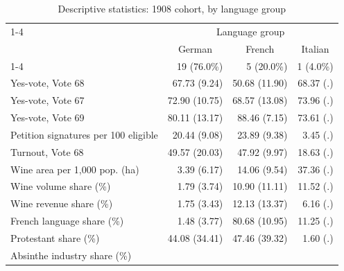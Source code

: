 \begin{table}[!h]
\caption{Descriptive statistics: 1908 cohort, by language group}
\centering
\begin{tabular}{llll}
\cline{1-4}
\multicolumn{1}{r}{} &
  \multicolumn{3}{c}{Language group} \\
\multicolumn{1}{r}{} &
  \multicolumn{1}{c}{German} &
  \multicolumn{1}{c}{French} &
  \multicolumn{1}{c}{Italian} \\
\cline{1-4}
\multicolumn{1}{l}{N} &
  \multicolumn{1}{r}{19 (76.0\%)} &
  \multicolumn{1}{r}{5 (20.0\%)} &
  \multicolumn{1}{r}{1 (4.0\%)} \\
\multicolumn{1}{l}{Yes-vote, Vote 68} &
  \multicolumn{1}{r}{67.73 (9.24)} &
  \multicolumn{1}{r}{50.68 (11.90)} &
  \multicolumn{1}{r}{68.37 (.)} \\
\multicolumn{1}{l}{Yes-vote, Vote 67} &
  \multicolumn{1}{r}{72.90 (10.75)} &
  \multicolumn{1}{r}{68.57 (13.08)} &
  \multicolumn{1}{r}{73.96 (.)} \\
\multicolumn{1}{l}{Yes-vote, Vote 69} &
  \multicolumn{1}{r}{80.11 (13.17)} &
  \multicolumn{1}{r}{88.46 (7.15)} &
  \multicolumn{1}{r}{73.61 (.)} \\
\multicolumn{1}{l}{Petition signatures per 100 eligible} &
  \multicolumn{1}{r}{20.44 (9.08)} &
  \multicolumn{1}{r}{23.89 (9.38)} &
  \multicolumn{1}{r}{3.45 (.)} \\
\multicolumn{1}{l}{Turnout, Vote 68} &
  \multicolumn{1}{r}{49.57 (20.03)} &
  \multicolumn{1}{r}{47.92 (9.97)} &
  \multicolumn{1}{r}{18.63 (.)} \\
\multicolumn{1}{l}{Wine area per 1,000 pop. (ha)} &
  \multicolumn{1}{r}{3.39 (6.17)} &
  \multicolumn{1}{r}{14.06 (9.54)} &
  \multicolumn{1}{r}{37.36 (.)} \\
\multicolumn{1}{l}{Wine volume share (\%)} &
  \multicolumn{1}{r}{1.79 (3.74)} &
  \multicolumn{1}{r}{10.90 (11.11)} &
  \multicolumn{1}{r}{11.52 (.)} \\
\multicolumn{1}{l}{Wine revenue share (\%)} &
  \multicolumn{1}{r}{1.75 (3.43)} &
  \multicolumn{1}{r}{12.13 (13.37)} &
  \multicolumn{1}{r}{6.16 (.)} \\
\multicolumn{1}{l}{French language share (\%)} &
  \multicolumn{1}{r}{1.48 (3.77)} &
  \multicolumn{1}{r}{80.68 (10.95)} &
  \multicolumn{1}{r}{11.25 (.)} \\
\multicolumn{1}{l}{Protestant share (\%)} &
  \multicolumn{1}{r}{44.08 (34.41)} &
  \multicolumn{1}{r}{47.46 (39.32)} &
  \multicolumn{1}{r}{1.60 (.)} \\
\multicolumn{1}{l}{Absinthe industry share (\%)} &

\end{tabular}
\end{table}
